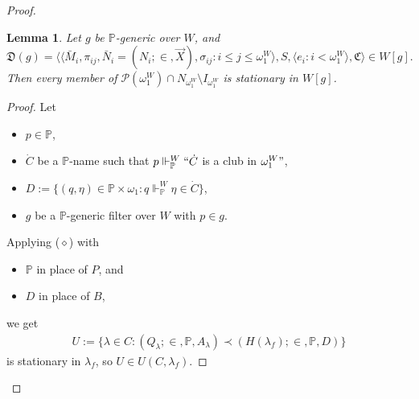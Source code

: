 \documentclass[12pt, twoside]{memoir}
\numberwithin{equation}{section}
\newtheorem{lem}[thm]{Lemma}
\theoremstyle{definition}
\theoremstyle{remark}
\theoremstyle{definition}
\theoremstyle{definition}
\theoremstyle{definition}
\theoremstyle{remark}
\begin{document}
\begin{proof}
\begin{lem}\label{lem453}
Let $g$ be $\mathbb{P}$-generic over $W$, and
\begin{equation*}
    \mathfrak{D}(g) = \langle \langle \bar{M}_i, \pi_{ij},  \bar{N}_i = (N_i; \in, \Vec{X}), \sigma_{ij} : i \leq j \leq \omega_1^W \rangle, S, \langle e_i : i < \omega_1^W \rangle, \mathfrak{C} \rangle \in W[g] \text{.}
\end{equation*}
Then every member of $\mathcal{P}(\omega_1^W) \cap N_{\omega_1^W} \setminus I_{\omega_1^W}$ is stationary in $W[g]$.
\end{lem}

\begin{proof}
Let 
\begin{itemize}
    \item $p \in \mathbb{P}$,
    \item $\dot{C}$ be a $\mathbb{P}$-name such that $p \Vdash^W_{\mathbb{P}} ``\dot{C}$ is a club in $\omega_1^W"$,
    \item $D := \{(q, \eta) \in \mathbb{P} \times \omega_1 : q \Vdash^W_{\mathbb{P}} \eta \in \dot{C}\}$,
    \item $g$ be a $\mathbb{P}$-generic filter over $W$ with $p \in g$.
\end{itemize}
Applying ($\diamond$) with 
\begin{itemize}
    \item $\mathbb{P}$ in place of $P$, and
    \item $D$ in place of $B$,
\end{itemize}
we get
\begin{align*}
    U := \{\lambda \in C : (Q_{\lambda}; \in, \mathbb{P}, A_{\lambda}) \prec (H(\lambda_f); \in, \mathbb{P}, D)\}
\end{align*}
is stationary in $\lambda_f$, so $U \in U(C, \lambda_f)$.


\end{proof}
\end{proof}
\end{document}
